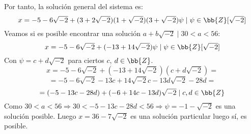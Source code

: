 \documentclass[12pt]{article}
\newcounter{ejercicio}[section] %
\newcounter{ejercicio}
\begin{document}
\begin{ejercicio}[2.5 puntos]
        \noindent
        Por tanto, la solución general del sistema es:
        $$x = -5-6\sqrt{-2} + (3+2\sqrt{-2})(1+\sqrt{-2})(3+\sqrt{-2})\psi \mid \psi \in \bb{Z}[\sqrt{-2}]$$
        \newpage
        \noindent
        Veamos si es posible encontrar una solución $a+b\sqrt{-2} \mid 30 < a < 56$:\\

        \noindent
        $$x = -5-6\sqrt{-2} + (-13+14\sqrt{-2})\psi \mid \psi \in \bb{Z}[\sqrt{-2}]$$
        Con $\psi = c+d\sqrt{-2}$ para ciertos $c$, $d \in \bb{Z}$.
        $$x = -5-6\sqrt{-2} + (-13+14\sqrt{-2})(c+d\sqrt{-2}) =$$ 
        $$ = -5-6\sqrt{-2} -13c + 14\sqrt{-2}c-13d\sqrt{-2}-28d =$$
        $$= (-5-13c-28d)+(-6+14c-13d)\sqrt{-2} \mid c,d \in \bb{Z}$$
        Como $30 < a < 56 \Rightarrow 30 < -5-13c-28d<56 \Rightarrow \psi = -1-\sqrt{-2}$ es una solución posible.\newline
        Luego $x = 36 -7\sqrt{-2}$ es una solución particular luego sí, es posible.

    \end{ejercicio}
\end{document}
